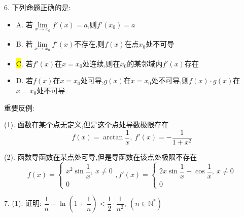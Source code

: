 6. 下列命题正确的是:  
\begin{itemize}
	\item A. 若$\lim\limits_{x\rightarrow x_{0}}f'(x)=a$,则$f'(x_{0})=a$
	\item B. 若$\lim\limits_{x\rightarrow x_{0}}f'(x)$不存在,则$f(x)$在点$x_{0}$处不可导
	\item \hl{C}. 若$f'(x)$在$x=x_{0}$处连续,则在$x_{0}$的某邻域内$f'(x)$存在
	\item D. 若$f(x)$在$x=x_{0}$处可导,$g(x)$在$x=x_{0}$处不可导,则$f(x)\cdot g(x)$在$x=x_{0}$处不可导
\end{itemize}
\begin{solution}

	重要反例:  
	
	(1). 函数在某个点无定义,但是这个点处导数极限存在
	$$f(x)=\arctan\dfrac{1}{x},\ f'(x)=-\dfrac{1}{1+x^2}$$
	
	(2). 函数导函数在某点处可导,但是导函数在该点处极限不存在
	$$f(x)=\left\lbrace
	\begin{array}{l}
		x^2\sin\dfrac{1}{x},\ x\neq 0\\
		0
	\end{array}
	\right. ,f'(x)=\left\lbrace
	\begin{array}{l}
		2x\sin\dfrac{1}{x}-\cos\dfrac{1}{x},\ x\neq 0\\
		0
	\end{array}
	\right. $$
\end{solution}

7. (1). 证明:  $\dfrac{1}{n}-\ln(1+\dfrac{1}{n})<\dfrac{1}{2}\cdot\dfrac{1}{n^2},\ (n\in\mathbb{N}^{*})$

